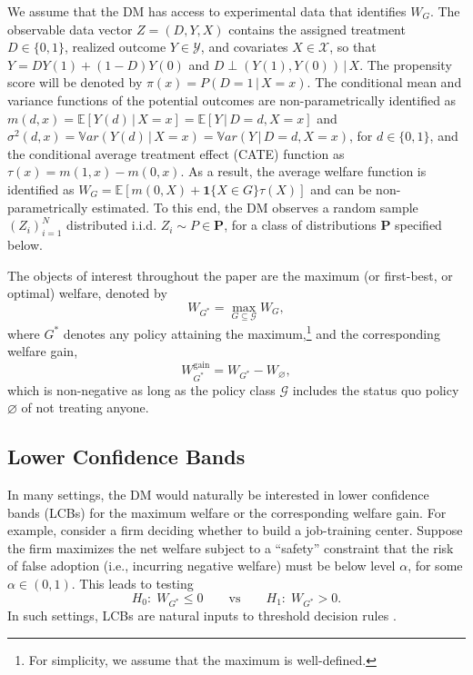 \documentclass[12pt]{article}
\numberwithin{equation}{section}
\theoremstyle{plain}                         %
\theoremstyle{definition}                  %
\theoremstyle{remark}                      %
\newcommand{\E}{\mathbb{E}}
\newcommand{\Var}{\mathbb{V}ar}
\begin{document}
We assume that the DM has access to experimental data that identifies $W_G$. The observable data vector $Z = (D, Y, X)$ contains the assigned treatment $D \in \{0, 1\}$, realized outcome $Y \in \mathcal{Y}$, and covariates $X \in \mathcal{X}$, so that  $Y = DY(1) + (1-D) Y(0)$ and $D \perp (Y(1), Y(0)) \,|\, X.$ The propensity score will be denoted by $\pi(x) = P(D = 1 \,|\,X = x)$. The conditional mean and variance functions of the potential outcomes are non-parametrically identified as $ m(d, x) = \E[Y(d) \,|\,X = x] = \E[Y \,|\, D = d, X = x]$ and $\sigma^2(d, x) = \Var(Y(d)\,|\,X = x) = \Var(Y \,|\,D = d, X = x)$, for  $d \in \{0, 1\}$, and the conditional average treatment effect (CATE) function as $\tau(x) = m(1, x) - m(0, x)$. As a result, the average welfare function is identified as $W_G = \E[m(0, X) + \bm{1}\{ X \in G \} \tau(X)]$ and can be non-parametrically estimated. To this end, the DM observes a random sample $(Z_i)_{i = 1}^N$ distributed i.i.d. $Z_i \sim P \in \mathbf{P}$, for a class of distributions $\mathbf{P}$  specified below. 


The objects of interest throughout the paper are the maximum (or first-best, or optimal) welfare, denoted by
\begin{equation} \label{eq:max_welfare}
W_{G^*} = \max \limits_{G \subseteq \mathcal{G}} W_G,
\end{equation}
where $G^*$ denotes any policy attaining the maximum,\footnote{For simplicity, we assume that the maximum is well-defined.} and the corresponding welfare gain,
\begin{equation} \label{eq:welfaregain}
W_{G^*}^{\text{gain}} = W_{G^*} - W_{\varnothing},
\end{equation}
which is non-negative as long as the policy class $\mathcal{G}$ includes the status quo policy $\varnothing$ of not treating anyone. 



\subsection{ Lower Confidence Bands} 
\label{sec:wgap}


In many settings, the DM would naturally be interested in lower confidence bands (LCBs) for the maximum welfare or the corresponding welfare gain. For example, consider a firm deciding whether to build a job-training center. Suppose the firm maximizes the net welfare subject to a ``safety'' constraint that the risk of false adoption (i.e., incurring negative welfare) must be below level $\alpha$, for some $\alpha \in (0,1)$. This leads to testing
\[
H_0:\; W_{G^*} \leq  0
\qquad\text{vs}\qquad
H_1:\;  W_{G^*} >  0.
\]
In such settings, LCBs are natural inputs to threshold decision rules \citep[see, e.g., Section 3.5 of][]{LehmannRomano}.
\end{document}
